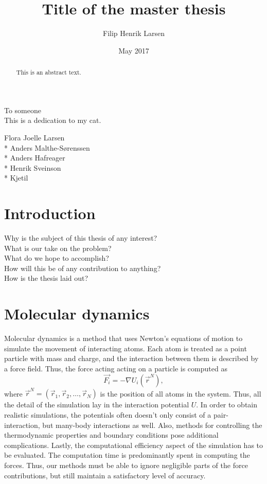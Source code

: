 \documentclass[twoside,english]{uiofysmaster}
\author{Filip Henrik Larsen}
\title{Title of the master thesis}
\date{May 2017}
\begin{document}
\maketitle

\begin{abstract}
This is an abstract text.
\end{abstract}

\begin{dedication}
  To someone
  \\\vspace{12pt}
  This is a dedication to my cat.
\end{dedication}

\begin{acknowledgements}
  Flora Joelle Larsen\\*
  Anders Malthe-Sørenssen \\*
  Anders Hafreager \\*
  Henrik Sveinson \\*
  Kjetil
\end{acknowledgements}
{
\hypersetup{linkcolor = black}
\tableofcontents
}
\chapter{Introduction}

Why is the subject of this thesis of any interest?\\
What is our take on the problem?\\
What do we hope to accomplish?\\
How will this be of any contribution to anything?\\
How is the thesis laid out?


\chapter{Molecular dynamics}
Molecular dynamics is a method that uses Newton’s equations of motion to simulate the movement of interacting atoms. 
Each atom is treated as a point particle with mass and charge, and the interaction between them is described by a force field. 
Thus, the force acting acting on a particle is computed as
\begin{equation}
	\vec{F_i} = -\nabla U_i(\vec{r}^N), \label{MDForce}
\end{equation} 
where $\vec{r}^N=(\vec{r}_1, \vec{r}_2, \dots, \vec{r}_N)$ is the position of all atoms in the system. 
Thus, all the detail of the simulation lay in the interaction potential $U$.
In order to obtain realistic simulations, the potentials often doesn't only consist of a pair-interaction, but many-body interactions as well.
Also, methods for controlling the thermodynamic properties and boundary conditions pose additional complications.
Lastly, the computational efficiency aspect of the simulation has to be evaluated. 
The computation time is predominantly spent in computing the forces. 
Thus, our methods must be able to ignore negligible parts of the force contributions, but still maintain a satisfactory level of accuracy. 
\end{document}
